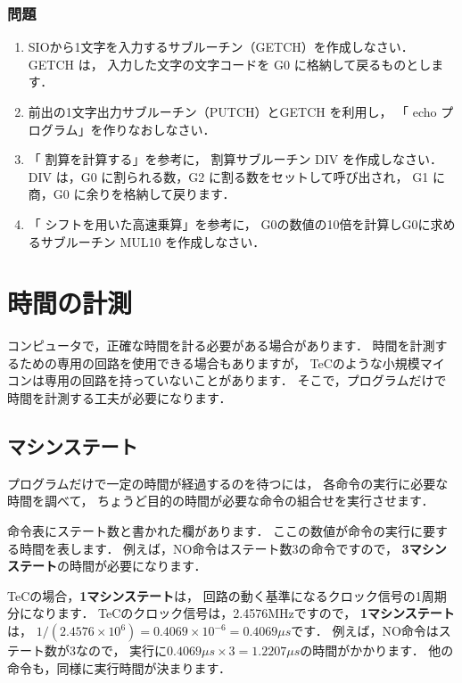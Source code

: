 \vfill
\subsubsection{問題}
\begin{enumerate}
\item SIOから1文字を入力するサブルーチン（GETCH）を作成しなさい．
GETCH は，
入力した文字の文字コードを G0 に格納して戻るものとします．
\item 前出の1文字出力サブルーチン（PUTCH）とGETCH を利用し，
「 echo プログラム」を作りなおしなさい．
\item 「 割算を計算する」を参考に，
割算サブルーチン DIV を作成しなさい．
DIV は，G0 に割られる数，G2 に割る数をセットして呼び出され，
G1 に商，G0 に余りを格納して戻ります．
\item 「 シフトを用いた高速乗算」を参考に，
G0の数値の10倍を計算しG0に求めるサブルーチン MUL10 を作成しなさい．
\end{enumerate}
\vfill

\newpage
\section{時間の計測}

コンピュータで，正確な時間を計る必要がある場合があります．
時間を計測するための専用の回路を使用できる場合もありますが，
TeCのような小規模マイコンは専用の回路を持っていないことがあります．
そこで，プログラムだけで時間を計測する工夫が必要になります．

\subsection{マシンステート}

プログラムだけで一定の時間が経過するのを待つには，
各命令の実行に必要な時間を調べて，
ちょうど目的の時間が必要な命令の組合せを実行させます．

命令表にステート数と書かれた欄があります．
ここの数値が命令の実行に要する時間を表します．
例えば，NO命令はステート数3の命令ですので，
{\bf 3マシンステート}の時間が必要になります．

TeCの場合，{\bf 1マシンステート}は，
回路の動く基準になるクロック信号の1周期分になります．
TeCのクロック信号は，2.4576MHzですので，
{\bf 1マシンステート}は，
$1/(2.4576\times10^6) = 0.4069\times10^{-6} = 0.4069 \mu s$です．
例えば，NO命令はステート数が3なので，
実行に$0.4069 \mu s \times 3 = 1.2207 \mu s$の時間がかかります．
他の命令も，同様に実行時間が決まります．

